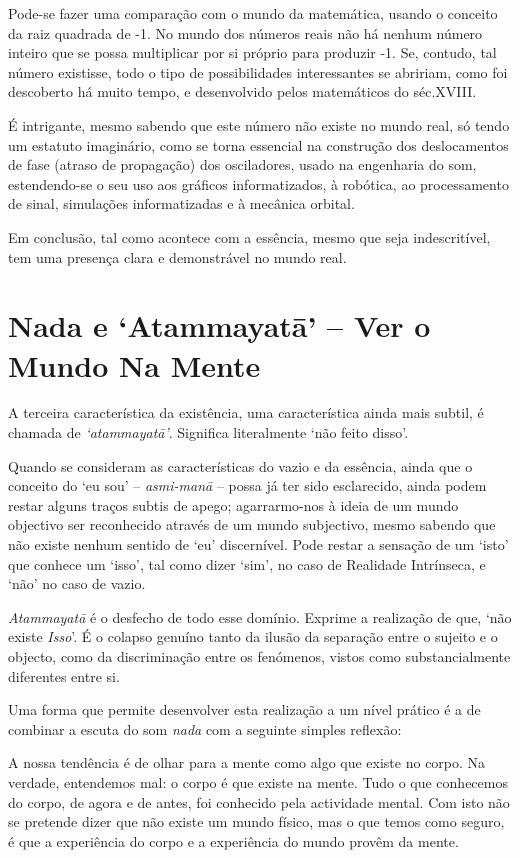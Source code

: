 Pode-se fazer uma comparação com o mundo da matemática, usando o
conceito da raiz quadrada de -1. No mundo dos números reais não há
nenhum número inteiro que se possa multiplicar por si próprio para
produzir -1. Se, contudo, tal número existisse, todo o tipo de
possibilidades interessantes se abririam, como foi descoberto há muito
tempo, e desenvolvido pelos matemáticos do séc.XVIII.

É intrigante, mesmo sabendo que este número não existe no mundo real, só
tendo um estatuto imaginário, como se torna essencial na construção dos
deslocamentos de fase (atraso de propagação) dos osciladores, usado na
engenharia do som, estendendo-se o seu uso aos gráficos informatizados,
à robótica, ao processamento de sinal, simulações informatizadas e à
mecânica orbital.

Em conclusão, tal como acontece com a essência, mesmo que seja
indescritível, tem uma presença clara e demonstrável no mundo real.\cite{imaginary}

\section{Nada e `Atammayatā' -- Ver o Mundo Na Mente}

A terceira característica da existência, uma característica ainda mais
subtil, é chamada de \emph{`atammayatā'}. Significa literalmente `não
feito disso'.

Quando se consideram as características do vazio e da essência, ainda
que o conceito do `eu sou' -- \emph{asmi-manā} -- possa já ter sido
esclarecido, ainda podem restar alguns traços subtis de apego;
agarrarmo-nos à ideia de um mundo objectivo ser reconhecido através de
um mundo subjectivo, mesmo sabendo que não existe nenhum sentido de `eu'
discernível. Pode restar a sensação de um `isto' que conhece um `isso',
tal como dizer `sim', no caso de Realidade Intrínseca, e `não' no caso
de vazio.

\emph{Atammayatā} é o desfecho de todo esse domínio. Exprime a
realização de que, `não existe \emph{Isso}'. É o colapso genuíno tanto
da ilusão da separação entre o sujeito e o objecto, como da
discriminação entre os fenómenos, vistos como substancialmente
diferentes entre si.

Uma forma que permite desenvolver esta realização a um nível prático é a
de combinar a escuta do som \emph{nada} com a seguinte simples reflexão:

A nossa tendência é de olhar para a mente como algo que existe no corpo.
Na verdade, entendemos mal: o corpo é que existe na mente. Tudo o que
conhecemos do corpo, de agora e de antes, foi conhecido pela actividade
mental. Com isto não se pretende dizer que não existe um mundo físico,
mas o que temos como seguro, é que a experiência do corpo e a
experiência do mundo provêm da mente.

